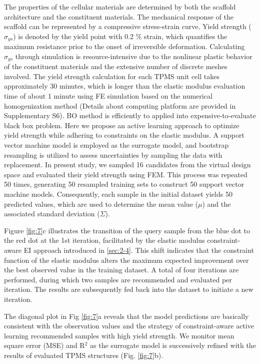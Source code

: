\documentclass[preprint,review,12pt,authoryear]{elsarticle}
\begin{document}
The properties of the cellular materials are determined by both the scaffold architecture and the constituent materials. The mechanical response of the scaffold can be represented by a compressive stress-strain curve. Yield strength ($\sigma_{ys}$) is denoted by the yield point with 0.2 \% strain, which quantifies the maximum resistance prior to the onset of irreversible deformation. Calculating $\sigma_{ys}$ through simulation is resource-intensive due to the nonlinear plastic behavior of the constituent materials and the extensive number of discrete meshes involved. The yield strength calculation for each TPMS unit cell takes approximately 30 minutes, which is longer than the elastic modulus evaluation time of about 1 minute using FE simulation based on the numerical homogenization method (Details about computing platform are provided in Supplementary S6). BO method is efficiently to applied into expensive-to-evaluate black box problem. Here we propose an active learning approach to optimize yield strength while adhering to constraints on the elastic modulus. A support vector machine model is employed as the surrogate model, and bootstrap resampling is utilized to assess uncertainties by sampling the data with replacement. In present study, we sampled 16 candidates from the virtual design space and evaluated their yield strength using FEM. This process was repeated 50 times, generating 50 resampled training sets to construct 50 support vector machine models. Consequently, each sample in the initial dataset yields 50 predicted values, which are used to determine the mean value ($\mu$) and the associated standard deviation ($\Sigma$).

Figure \ref{fig:7}c illustrates the transition of the query sample from the blue dot to the red dot at the 1st iteration, facilitated by the elastic modulus constraint-aware EI approach introduced in \ref{sec:2-4}. This shift indicates that the constraint function of the elastic modulus alters the maximum expected improvement over the best observed value in the training dataset. A total of four iterations are performed, during which two samples are recommended and evaluated per iteration. The results are subsequently fed back into the dataset to initiate a new iteration.

The diagonal plot in Fig \ref{fig:7}a reveals that the model predictions are basically consistent with the observation values and the strategy of constraint-aware active learning recommended samples with high yield strength. We monitor mean square error (MSE) and R$^2$ as the surrogate model is successively refined with the results of evaluated TPMS structures  (Fig. \ref{fig:7}b). 
\end{document}
